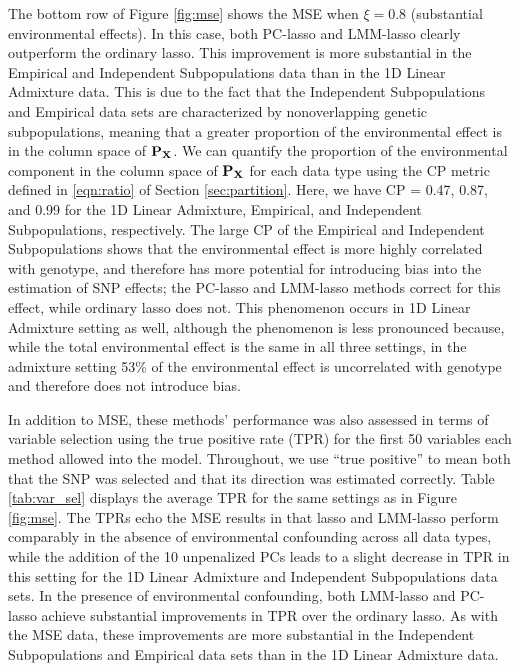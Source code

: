 The bottom row of Figure \ref{fig:mse} shows the MSE when $\xi = 0.8$ (substantial environmental effects). In this case, both PC-lasso and LMM-lasso clearly outperform the ordinary lasso. This improvement is more substantial in the Empirical and Independent Subpopulations data than in the 1D Linear Admixture data. This is due to the fact that the Independent Subpopulations and Empirical data sets are characterized by nonoverlapping genetic subpopulations, meaning that a greater proportion of the environmental effect is in the column space of $\mathbf{P}_{\mathbf{X}}$. We can quantify the proportion of the environmental component in the column space of $\mathbf{P}_{\mathbf{X}}$ for each data type using the CP metric defined in \eqref{eqn:ratio} of Section \ref{sec:partition}. Here, we have CP = 0.47, 0.87, and 0.99 for the 1D Linear Admixture, Empirical, and Independent Subpopulations, respectively. The large CP of the Empirical and Independent Subpopulations shows that the environmental effect is more highly correlated with genotype, and therefore has more potential for introducing bias into the estimation of SNP effects; the PC-lasso and LMM-lasso methods correct for this effect, while ordinary lasso does not.  This phenomenon occurs in 1D Linear Admixture setting as well, although the phenomenon is less pronounced because, while the total environmental effect is the same in all three settings, in the admixture setting 53\% of the environmental effect is uncorrelated with genotype and therefore does not introduce bias.

In addition to MSE, these methods' performance was also assessed in terms of variable selection using the true positive rate (TPR) for the first 50 variables each method allowed into the model. Throughout, we use ``true positive'' to mean both that the SNP was selected and that its direction was estimated correctly. Table \ref{tab:var_sel} displays the average TPR for the same settings as in Figure \ref{fig:mse}. The TPRs echo the MSE results in that lasso and LMM-lasso perform comparably in the absence of environmental confounding across all data types, while the addition of the 10 unpenalized PCs leads to a slight decrease in TPR in this setting for the 1D Linear Admixture and Independent Subpopulations data sets. In the presence of environmental confounding, both LMM-lasso and PC-lasso achieve substantial improvements in TPR over the ordinary lasso. As with the MSE data, these improvements are more substantial in the Independent Subpopulations and Empirical data sets than in the 1D Linear Admixture data.


